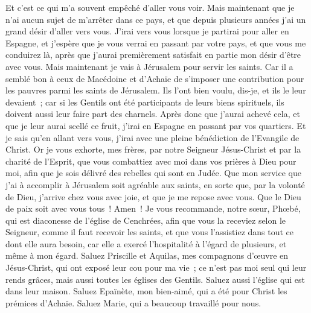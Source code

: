 \begin{multicols}{2}
Et c'est ce qui m'a souvent empêché d'aller vous voir.
Mais maintenant que je n'ai aucun sujet de m'arrêter dans ce pays, et que depuis plusieurs années j'ai un grand désir d'aller vers vous.
J'irai vers vous lorsque je partirai pour aller en Espagne, et j'espère que je vous verrai en passant par votre pays, et que vous me conduirez là, après que j'aurai premièrement satisfait en partie mon désir d'être avec vous.
Mais maintenant je vais à Jérusalem pour servir les saints.
Car il a semblé bon à ceux de Macédoine et d'Achaïe de s'imposer une contribution pour les pauvres parmi les saints de Jérusalem.
Ils l'ont bien voulu, dis-je, et ils le leur devaient~; car si les Gentils ont été participants de leurs biens spirituels, ils doivent aussi leur faire part des charnels.
Après donc que j'aurai achevé cela, et que je leur aurai scellé ce fruit, j'irai en Espagne en passant par vos quartiers.
Et je sais qu'en allant vers vous, j'irai avec une pleine bénédiction de l'Evangile de Christ.
Or je vous exhorte, mes frères, par notre Seigneur Jésus-Christ et par la charité de l'Esprit, que vous combattiez avec moi dans vos prières à Dieu pour moi,
afin que je sois délivré des rebelles qui sont en Judée. Que mon service que j'ai à accomplir à Jérusalem soit agréable aux saints,
en sorte que, par la volonté de Dieu, j'arrive chez vous avec joie, et que je me repose avec vous.
Que le Dieu de paix soit avec vous tous~! Amen~!
\VerseOne{}Je vous recommande, notre sœur, Phœbé, qui est diaconesse de l'église de Cenchrées,
afin que vous la receviez selon le Seigneur, comme il faut recevoir les saints, et que vous l'assistiez dans tout ce dont elle aura besoin, car elle a exercé l'hospitalité à l'égard de plusieurs, et même à mon égard.
Saluez Priscille et Aquilas, mes compagnons d'œuvre en Jésus-Christ,
qui ont exposé leur cou pour ma vie~; ce n'est pas moi seul qui leur rends grâces, mais aussi toutes les églises des Gentils.
Saluez aussi l'église qui est dans leur maison. Saluez Epaïnète, mon bien-aimé, qui a été pour Christ les prémices d'Achaïe.
Saluez Marie, qui a beaucoup travaillé pour nous.

\end{multicols}
